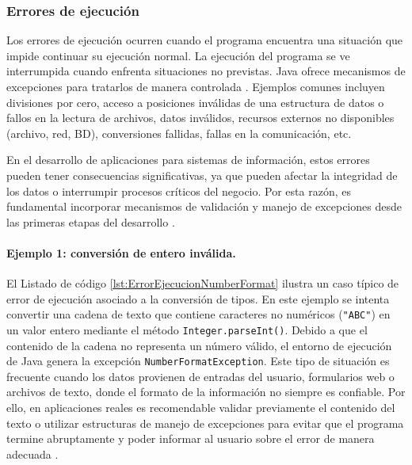 \documentclass[12pt,twoside]{book}
\begin{document}
					\subsubsection{Errores de ejecución}
						\noindent
						Los errores de ejecución ocurren cuando el programa encuentra una situación que impide continuar su ejecución normal. La ejecución del programa se ve interrumpida cuando enfrenta situaciones no previstas. Java ofrece mecanismos de excepciones para tratarlos de manera controlada \cite{Pressman2019Software,Sommerville2015Software}. Ejemplos comunes incluyen divisiones por cero, acceso a posiciones inválidas de una estructura de datos o fallos en la lectura de archivos, datos inválidos, recursos externos no disponibles (archivo, red, BD), conversiones fallidas, fallas en la comunicación, etc.
						
						En el desarrollo de aplicaciones para sistemas de información, estos errores pueden tener consecuencias significativas, ya que pueden afectar la integridad de los datos o interrumpir procesos críticos del negocio. Por esta razón, es fundamental incorporar mecanismos de validación y manejo de excepciones desde las primeras etapas del desarrollo \cite{Sommerville2015Software,Pressman2019Software}.
						
						\paragraph{Ejemplo 1: conversión de entero inválida.} 
						\noindent
						El Listado de código \ref{lst:ErrorEjecucionNumberFormat} ilustra un caso típico de error de ejecución asociado a la conversión de tipos. En este ejemplo se intenta convertir una cadena de texto que contiene caracteres no numéricos (\texttt{"ABC"}) en un valor entero mediante el método \texttt{Integer.parseInt()}. Debido a que el contenido de la cadena no representa un número válido, el entorno de ejecución de Java genera la excepción \texttt{NumberFormatException}. Este tipo de situación es frecuente cuando los datos provienen de entradas del usuario, formularios web o archivos de texto, donde el formato de la información no siempre es confiable. Por ello, en aplicaciones reales es recomendable validar previamente el contenido del texto o utilizar estructuras de manejo de excepciones para evitar que el programa termine abruptamente y poder informar al usuario sobre el error de manera adecuada \cite{Deitel2025Java,Pressman2019Software}.
						
\end{document}
